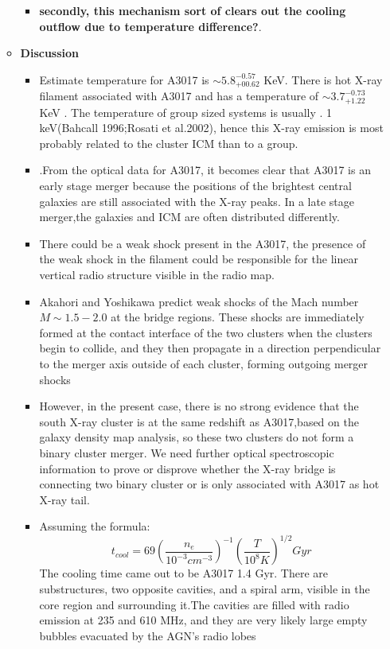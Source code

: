 \documentclass[11pt]{report}
\newcommand{\tbf}[1]{\textbf{#1}}
\newcommand{\cc}[1]{\left({#1}\right)}
\begin{document}
\begin{itemize}
\begin{itemize}
\begin{itemize}
\item \tbf{secondly, this mechanism sort of clears out the cooling outflow due to temperature difference?}.
\end{itemize}
\item \tbf{Discussion}
\begin{itemize}
\item Estimate temperature for A3017 is $\sim 5.8^{-0.57}_{+00.62}$ KeV. There is hot X-ray filament associated with A3017 and has a temperature of $\sim 3.7^{-0.73}_{+1.22}$ KeV . The temperature of group sized systems is usually . 1 keV(Bahcall 1996;Rosati et al.2002), hence this X-ray emission is most probably related to the cluster ICM than to a group.
\item .From the optical data for A3017, it becomes clear that A3017 is an early stage merger because the positions of the brightest central galaxies are still associated with the X-ray peaks. In a late stage merger,the galaxies and ICM are often distributed differently.
\item There could be a weak shock present in the A3017, the presence of the weak shock in the filament could be responsible for the linear vertical radio structure visible in the radio map.
\item Akahori and Yoshikawa predict weak shocks of the Mach number $M \sim 1.5-2.0$ at the bridge regions. These shocks are immediately formed at the contact interface of the two clusters when the clusters begin to collide, and they then propagate in a direction perpendicular to the merger axis outside of each cluster, forming outgoing merger shocks
\item However, in the present case, there is no strong evidence that the south X-ray cluster is at the same redshift as A3017,based on the galaxy density map analysis, so these two clusters do not form a binary cluster merger. We need further optical spectroscopic information to prove or disprove whether the X-ray bridge is connecting two binary cluster or is only associated with A3017 as hot X-ray tail.
\item Assuming the formula:
\begin{equation}
t_{cool}=69\cc{\frac{n_e}{10^{-3}cm^{-3}}}^{-1}\cc{\frac{T}{10^8 K}}^{1/2} Gyr
\end{equation}
The cooling time came out to be A3017 1.4 Gyr.  There are substructures, two opposite cavities, and a spiral arm, visible in the core region and surrounding it.The cavities are filled with radio emission at 235 and 610 MHz, and they are very likely large empty bubbles evacuated by the AGN's radio lobes
\end{itemize}
\end{itemize}
\end{itemize}
\end{document}
